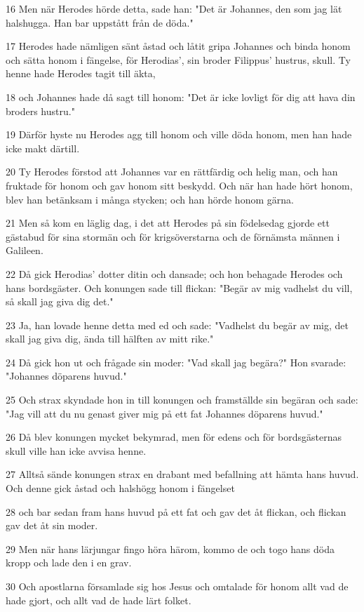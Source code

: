 \par 16 Men när Herodes hörde detta, sade han: "Det är Johannes, den som jag lät halshugga. Han bar uppstått från de döda."
\par 17 Herodes hade nämligen sänt åstad och låtit gripa Johannes och binda honom och sätta honom i fängelse, för Herodias', sin broder Filippus' hustrus, skull. Ty henne hade Herodes tagit till äkta,
\par 18 och Johannes hade då sagt till honom: "Det är icke lovligt för dig att hava din broders hustru."
\par 19 Därför hyste nu Herodes agg till honom och ville döda honom, men han hade icke makt därtill.
\par 20 Ty Herodes förstod att Johannes var en rättfärdig och helig man, och han fruktade för honom och gav honom sitt beskydd. Och när han hade hört honom, blev han betänksam i många stycken; och han hörde honom gärna.
\par 21 Men så kom en läglig dag, i det att Herodes på sin födelsedag gjorde ett gästabud för sina stormän och för krigsöverstarna och de förnämsta männen i Galileen.
\par 22 Då gick Herodias' dotter ditin och dansade; och hon behagade Herodes och hans bordsgäster. Och konungen sade till flickan: "Begär av mig vadhelst du vill, så skall jag giva dig det."
\par 23 Ja, han lovade henne detta med ed och sade: "Vadhelst du begär av mig, det skall jag giva dig, ända till hälften av mitt rike."
\par 24 Då gick hon ut och frågade sin moder: "Vad skall jag begära?" Hon svarade: "Johannes döparens huvud."
\par 25 Och strax skyndade hon in till konungen och framställde sin begäran och sade: "Jag vill att du nu genast giver mig på ett fat Johannes döparens huvud."
\par 26 Då blev konungen mycket bekymrad, men för edens och för bordsgästernas skull ville han icke avvisa henne.
\par 27 Alltså sände konungen strax en drabant med befallning att hämta hans huvud. Och denne gick åstad och halshögg honom i fängelset
\par 28 och bar sedan fram hans huvud på ett fat och gav det åt flickan, och flickan gav det åt sin moder.
\par 29 Men när hans lärjungar fingo höra härom, kommo de och togo hans döda kropp och lade den i en grav.
\par 30 Och apostlarna församlade sig hos Jesus och omtalade för honom allt vad de hade gjort, och allt vad de hade lärt folket.
